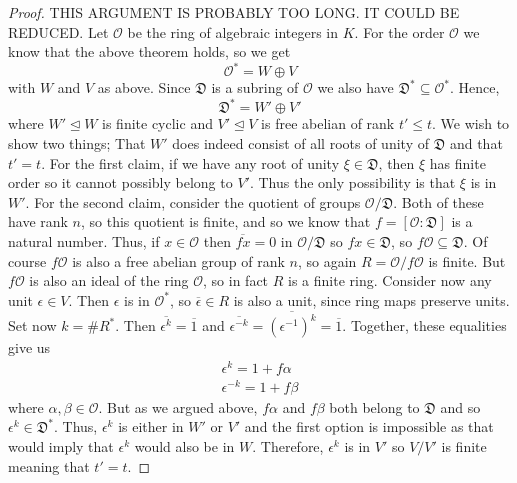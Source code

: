 \documentclass{article}
\newcommand{\mfrak}[1]{\mathfrak{#1}}
\newcommand{\mcal}[1]{\mathcal{#1}}
\begin{document}
\begin{proof}
    THIS ARGUMENT IS PROBABLY TOO LONG. IT COULD BE REDUCED.
    Let $\mcal O$ be the ring of algebraic integers in $K$. For the order $\mcal O$ we know that the above theorem holds, so we get
    $$\mcal O^* = W \oplus V$$
    with $W$ and $V$ as above. Since $\mfrak D$ is a subring of $\mcal O$ we also have $\mfrak D^* \subseteq \mcal O^*$. Hence, $$\mfrak D^* = W' \oplus V'$$ 
    where $W' \trianglelefteq W$ is finite cyclic and $V' \trianglelefteq V$ is free abelian of rank $t' \leq t$. We wish to show two things; That $W'$ does indeed consist of all roots of unity of $\mfrak D$ and that $t' = t$. For the first claim, if we have any root of unity $\xi \in \mfrak{D}$, then $\xi$ has finite order so it cannot possibly belong to $V'$. Thus the only possibility is that $\xi$ is in $W'$. For the second claim, consider the quotient of groups $\mcal O / \mfrak D$. Both of these have rank $n$, so this quotient is finite, and so we know that $f = [\mcal O : \mfrak D]$ is a natural number. Thus, if $x \in \mcal O$ then $\overline {fx} = 0$ in $\mcal O / \mfrak D$ so $fx \in \mfrak D$, so $f \mcal O \subseteq \mfrak D$. Of course $f \mcal O$ is also a free abelian group of rank $n$, so again $R = \mcal O / f \mcal O$ is finite. But $f\mcal O$ is also an ideal of the ring $\mcal O$, so in fact $R$ is a finite ring. Consider now any unit $\epsilon \in V$. Then $\epsilon$ is in $\mcal O^*$, so $\overline \epsilon \in R$ is also a unit, since ring maps preserve units. Set now $k = \# R^*$. Then $\overline {\epsilon^k} = \overline 1$ and $\overline {\epsilon^{-k}} = \overline {(\epsilon^{-1})^k} = \overline 1$. Together, these equalities give us
    \begin{align*}
        \epsilon^k = 1 + f \alpha \\
        \epsilon^{-k} = 1 + f \beta
    \end{align*}
    where $\alpha, \beta \in \mcal O$. But as we argued above, $f \alpha$ and $f \beta$ both belong to $\mfrak D$ and so $\epsilon^k \in \mfrak D^*$. Thus, $\epsilon^k$ is either in $W'$ or $V'$ and the first option is impossible as that would imply that $\epsilon^k$ would also be in $W$. Therefore, $\epsilon^k$ is in $V'$ so $V / V'$ is finite meaning that $t' = t$.
\end{proof}
\end{document}
